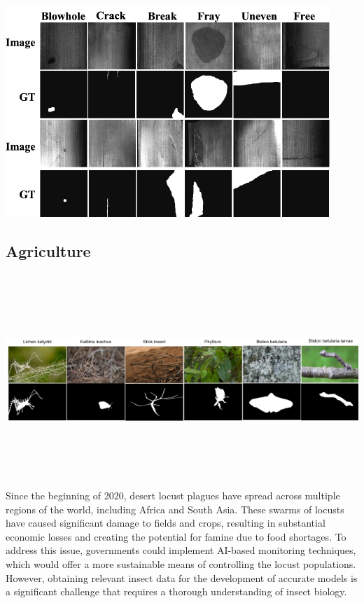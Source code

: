 \begin{multicols}{2}
\vspace{0.5cm}
\includegraphics[width=\columnwidth,height=8cm]{sections/LBP/Examples-of-https-githubcom-abin24-Magnetic-tile-defect-datasets-magnetic-tile-surface.png}
\vspace{0.5cm}
\subsection{{{\fontsize{14}{19}\selectfont \textbf{Agriculture}}}}
\vspace{0.5cm}
\includegraphics[width=\columnwidth,height=8cm]{sections/LBP/use2.png}
\vspace{0.5cm}
Since the beginning of 2020, desert locust plagues have spread across multiple regions of the world, including Africa and South Asia. These swarms of locusts have caused significant damage to fields and crops, resulting in substantial economic losses and creating the potential for famine due to food shortages. To address this issue, governments could implement AI-based monitoring techniques, which would offer a more sustainable means of controlling the locust populations. However, obtaining relevant insect data for the development of accurate models is a significant challenge that requires a thorough understanding of insect biology.


\end{multicols}
